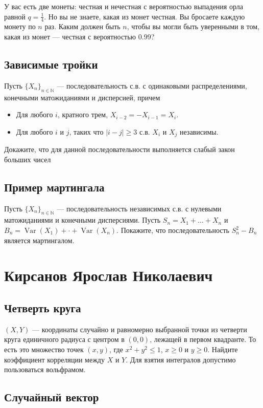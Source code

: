 \documentclass[12pt]{article}
\newcommand\N{\mathbb{N}}
\DeclareMathOperator{\Var}{Var}
\begin{document}
У вас есть две монеты: честная и нечестная с вероятностью выпадения орла равной $q = \frac{1}{4}$. Но вы не знаете, какая из монет честная. Вы бросаете каждую монету по $n$ раз. Каким должен быть $n$, чтобы вы могли быть уверенными в том, какая из монет --- честная с вероятностью $0.99$? 


\subsection{Зависимые тройки}
Пусть $\{X_n\}_{n \in \N}$ --- последовательность с.в. с одинаковыми распределениями, конечными матожиданиями и дисперсией, причем
\begin{itemize}
    \item Для любого $i$, кратного трем, $X_{i - 2} = - X_{i - 1} = X_{i}$. 
    \item Для любого $i$ и $j$, таких что $|i - j| \ge 3$ с.в. $X_i$ и $X_j$ независимы.
\end{itemize}
Докажите, что для данной последовательности выполняется слабый закон больших чисел


\subsection{Пример мартингала}

Пусть $\{X_n\}_{n \in \N}$ --- последовательность независимых с.в. с нулевыми матожиданиями и конечными дисперсиями. Пусть $S_n = X_1 + \dots + X_n$ и $B_n = \Var(X_1) + \cdot + \Var(X_n)$. Покажите, что последовательность $S_n^2 - B_n$ является мартингалом.


\newpage
\section{Кирсанов Ярослав Николаевич}

\subsection{Четверть круга}

$(X, Y)$ --- координаты случайно и равномерно выбранной точки из четверти круга единичного радиуса с центром в $(0, 0)$, лежащей в первом квадранте. То есть это множество точек $(x, y)$, где $x^2 + y^2 \le 1$, $x \ge 0$ и $y \ge 0$. Найдите коэффициент корреляции между $X$ и $Y$. Для взятия интегралов  допустимо пользоваться вольфрамом.


\subsection{Случайный вектор}
\end{document}
